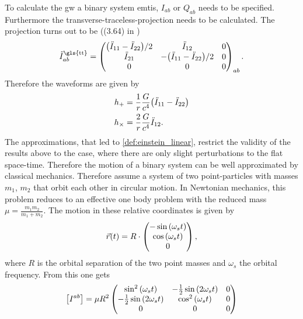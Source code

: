 \noindent To calculate the \gls{gw} a binary system emtis, $I_{ab}$ or $Q_{ab}$ needs to be specified. Furthermore the transverse-traceless-projection needs to be calculated. The projection turns out to be ((3.64) in \cite{gwv1})
\begin{equation}
\ddot{I}_{ab}^\text{\gls{tt}}=
\begin{pmatrix}
\lr{\ddot{I}_{11}-\ddot{I}_{22}}/2 & \ddot{I}_{12}                     & 0\\
\ddot{I}_{21}                      & -\lr{\ddot{I}_{11}-\ddot{I}_{22}}/2 & 0\\
0                                  & 0                                 & 0
\end{pmatrix}_{ab}.
\end{equation}
Therefore the waveforms are given by
\begin{align}
h_+ & = \frac{1}{r}\frac{G}{c^4}{\left( \ddot{I}_{11}-\ddot{I}_{22} \right)}\\
h_\times & = \frac{2}{r}\frac{G}{c^4}\ddot{I}_{12}.
\end{align}
The approximations, that led to \eqref{def:einstein_linear}, restrict the validity of the results above to the case, where there are only slight perturbations to the flat space-time. Therefore the motion of a binary system can be well approximated by classical mechanics. Therefore assume a system of two point-particles with masses $m_1$, $m_2$ that orbit each other in circular motion. In Newtonian mechanics, this problem reduces to an effective one body problem with the reduced mass $\mu=\frac{m_1m_2}{m_1+m_2}$. The motion in these relative coordinates is given by
\begin{equation}\label{def:binary_motion}
\vec{r}{\left( t \right)} = R\cdot
\begin{pmatrix}
	-\sin{\left( \omega_s t \right)}\\
	\cos{\left( \omega_s t \right)}\\
	0
\end{pmatrix},
\end{equation}
where $R$ is the orbital separation of the two point masses and $\omega_s$ the orbital frequency. From this one gets
\begin{equation}\label{def:binary_system_second_mass_moment}
\left[ I^{ab}\right] = \mu R^2\begin{pmatrix}
		\sin^2{\left( \omega_s t \right)} & -\frac{1}{2}\sin{\left( 2\omega_s t \right)} & 0\\
		-\frac{1}{2}\sin{\left( 2\omega_s t \right)} & \cos^2{\left( \omega_s t \right)} & 0\\
		0 & 0 & 0
	\end{pmatrix}
\end{equation}
